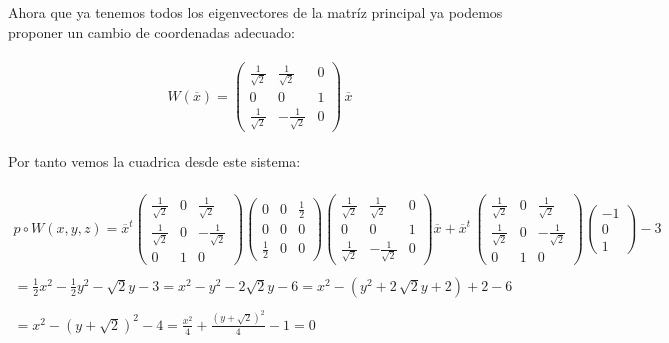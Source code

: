 \documentclass[11pt,letterpaper]{article}
\begin{document}
    Ahora que ya tenemos todos los eigenvectores de la matr\'iz principal ya podemos proponer un cambio de coordenadas adecuado:\,\\
    \,\\
    \begin{equation*}
        W(\overline{x})=
        \begin{pmatrix}
                \frac{1}{\sqrt{2}} & \frac{1}{\sqrt{2}} & 0\\
                0 & 0& 1\\
                 \frac{1}{\sqrt{2}} & -\frac{1}{\sqrt{2}} &0
                \end{pmatrix}\,\overline{x}
    \end{equation*}\,\\
    Por tanto vemos la cuadrica desde este sistema:\,\\
    \,\\
    \begin{align*}
        p\circ W(x,y,z)=\overline{x}^t \begin{pmatrix}
                \frac{1}{\sqrt{2}} & 0& \frac{1}{\sqrt{2}}\\
                \frac{1}{\sqrt{2}} & 0& -\frac{1}{\sqrt{2}}\\
                 0& 1 &0
                \end{pmatrix}
                \begin{pmatrix}
                0 & 0 & \frac{1}{2}\\
                0 & 0 & 0\\
                \frac{1}{2} & 0 & 0
                \end{pmatrix}
                \begin{pmatrix}
                \frac{1}{\sqrt{2}} & \frac{1}{\sqrt{2}} & 0\\
                0 & 0& 1\\
                 \frac{1}{\sqrt{2}} & -\frac{1}{\sqrt{2}} &0
                \end{pmatrix}\overline{x}+\overline{x}^t\,\begin{pmatrix}
                \frac{1}{\sqrt{2}} & 0& \frac{1}{\sqrt{2}}\\
                \frac{1}{\sqrt{2}} & 0& -\frac{1}{\sqrt{2}}\\
                 0& 1 &0
                \end{pmatrix}
                \begin{pmatrix}
                -1 \\
                0\\
                1
                \end{pmatrix}-3\,\\
                \,\\
                =\frac{1}{2}x^2-\frac{1}{2}y^2-\sqrt{2}y-3=x^2-y^2-2\sqrt{2}y-6=x^2-(y^2+2\,\sqrt{2}y+2)+2-6\,\\
                \,\\
                =x^2-(y+\sqrt{2})^2-4=\frac{x^2}{4}+\frac{(y+\sqrt{2})^2}{4}-1=0
    \end{align*}\,\\
\end{document}
